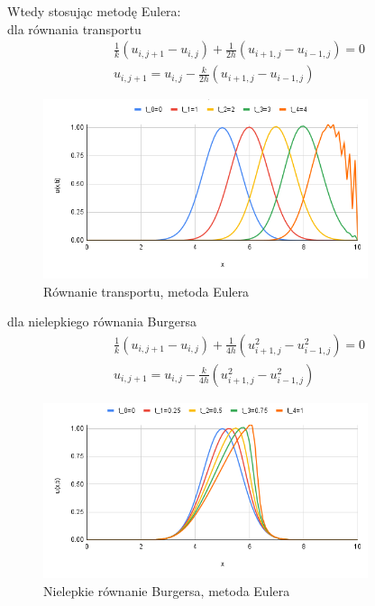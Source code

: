 \documentclass[a4paper,12pt]{article}
\begin{document}
	Wtedy stosując metodę Eulera:\\
	dla równania transportu
	\begin{equation}
		\begin{split}
			& \frac{1}{k}(u_{i,j+1}-u_{i,j})+\frac{1}{2h}(u_{i+1,j}-u_{i-1,j})=0\\
			& u_{i,j+1}=u_{i,j}-\frac{k}{2h}(u_{i+1,j}-u_{i-1,j})
		\end{split}
	\end{equation}
	\begin{figure}[h]
		\caption{Równanie transportu, metoda Eulera}
		\centering
		\includegraphics[width=0.85\textwidth]{rys/0.png}
	\end{figure}
	dla nielepkiego równania Burgersa
	\begin{equation}
		\begin{split}
			& \frac{1}{k}(u_{i,j+1}-u_{i,j})+\frac{1}{4h}(u_{i+1,j}^{2}-u_{i-1,j}^{2})=0\\
			& u_{i,j+1}=u_{i,j}-\frac{k}{4h}(u_{i+1,j}^{2}-u_{i-1,j}^{2})
		\end{split}
	\end{equation}
	\begin{figure}[h]
		\caption{Nielepkie równanie Burgersa, metoda Eulera}
		\centering
		\includegraphics[width=0.85\textwidth]{rys/1.png}
	\end{figure}
	\newpage
	
\end{document}
